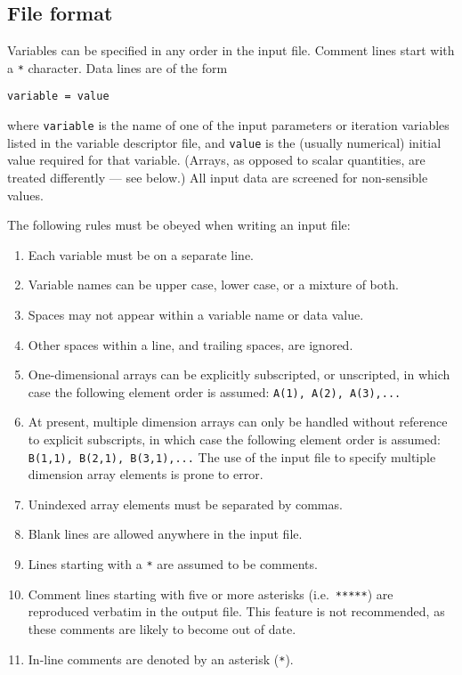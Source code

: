 \documentclass[11pt,a4paper]{report}
\begin{document}
\subsection{File format}

Variables can be specified in any order in the input file.  Comment lines start with a \texttt{*} character.  Data lines are of the form
\begin{verbatim}
variable = value
\end{verbatim}
where \texttt{variable} is the name of one of the input parameters or
iteration variables listed in the variable descriptor file, and \texttt{value}
is the (usually numerical) initial value required for that variable. (Arrays,
as opposed to scalar quantities, are treated differently --- see below.) All input data are screened for non-sensible values.

The following rules must be obeyed when writing an input file:

\begin{enumerate}

\item Each variable must be on a separate line.

\item Variable names can be upper case, lower case, or a mixture of both.

\item Spaces may not appear within a variable name or data value.

\item Other spaces within a line, and trailing spaces, are ignored.

\item One-dimensional arrays can be explicitly subscripted, or unscripted, in
  which case the following element order is assumed: \texttt{A(1), A(2),
    A(3),...}

\item At present, multiple dimension arrays can only be handled without
  reference to explicit subscripts, in which case the following element order
  is assumed: \texttt{B(1,1), B(2,1), B(3,1),...} The use of the input file to
  specify multiple dimension array elements is prone to error.

\item Unindexed array elements must be separated by commas.

\item Blank lines are allowed anywhere in the input file.

\item Lines starting with a \texttt{*} are assumed to be comments.

\item Comment lines starting with five or more asterisks (i.e.\
  \texttt{*****}) are reproduced verbatim in the output file. This feature is not recommended, as these comments are likely to become out of date.

\item In-line comments are denoted by an asterisk (\texttt{*}).

\end{enumerate}
\end{document}
